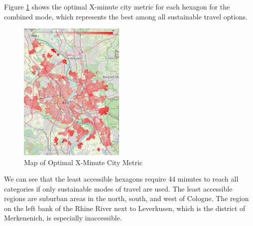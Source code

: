 Figure \ref{fig:optimal_map} shows the optimal X-minute city metric for each hexagon for the combined mode, which represents the best among all sustainable travel options.
\begin{figure}
  \begin{center}
    \includegraphics[width=0.45\textwidth]{Figures/results/minute_city_metric/optimal_map}
  \end{center}
  \caption{Map of Optimal X-Minute City Metric}
  \label{fig:optimal_map}
\end{figure}
We can see that the least accessible hexagons require 44 minutes to reach all categories if only sustainable modes of travel are used.
The least accessible regions are suburban areas in the north, south, and west of Cologne. 
The region on the left bank of the Rhine River next to Leverkusen, which is the district of Merkenenich, is especially inaccessible.

